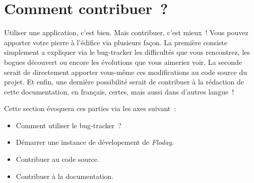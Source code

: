 \section{Comment contribuer~?}
	\begin{intro}
	Utiliser une application, c'est bien. Mais contribuer, c'est mieux~!
	Vous pouvez apporter votre pierre à l'édifice via plusieurs façon.
	La première consiste simplement a expliquer via le bug-tracker les difficultés que vous rencontrez, les bogues découvert ou encore les évolutions que vous aimeriez voir.
	La seconde serait de directement apporter vous-même ces modifications au code source du projet.
	Et enfin, une dernière possibilité serait de contribuer à la rédaction de cette documentation, en français, certes, mais aussi dans d'autres langue~!

	Cette section évoquera ces parties via les axes suivant~:
	\begin{itemize}
		\item Comment utiliser le bug-tracker~?
		\item Démarrer une instance de dévelopement de \emph{Floday}.
		\item Contribuer au code source.
		\item Contribuer à la documentation.
	\end{itemize}
\end{intro}





